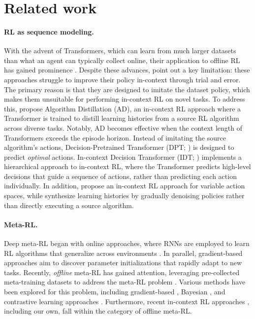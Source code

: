 \section{Related work}
\label{sec:rel}
\paragraph*{RL as sequence modeling.}
With the advent of Transformers, which can learn from much larger datasets than what an agent can typically collect online, their application to offline RL \citep{offlineRL} has gained prominence \citep{DT, TTO, MGDT, GATO}.
Despite these advances, \citet{AD} point out a key limitation: these approaches struggle to improve their policy in-context through trial and error.
The primary reason is that they are designed to imitate the dataset policy, which makes them unsuitable for performing in-context RL on novel tasks.
To address this, \citet{AD} propose Algorithm Distillation (AD), an in-context RL approach where a Transformer is trained to distill learning histories from a source RL algorithm across diverse tasks.
Notably, AD becomes effective when the context length of Transformers exceeds the episode horizon.
Instead of imitating the source algorithm's actions, Decision-Pretrained Transformer (DPT; \citet{DPT}) is designed to predict \emph{optimal} actions.
In-context Decision Transformer (IDT; \citet{IDT}) implements a hierarchical approach to in-context RL, where the Transformer predicts high-level decisions that guide a sequence of actions, rather than predicting each action individually.
In addition, \citet{Headless-AD} propose an in-context RL approach for variable action spaces, while \citet{AD-eps} synthesize learning histories by gradually denoising policies rather than directly executing a source algorithm.

\paragraph*{Meta-RL.}
Deep meta-RL began with online approaches, where RNNs are employed to learn RL algorithms that generalize across environments \citep{RL2, LtoRL}.
In parallel, gradient-based approaches \citep{MAML, Reptile} aim to discover parameter initializations that rapidly adapt to new tasks.
Recently, \emph{offline} meta-RL has gained attention, leveraging pre-collected meta-training datasets to address the meta-RL problem \citep{MACAW,BOReL,CORRO,IDAQ,MoSS}.
Various methods have been explored for this problem, including gradient-based \citep{MACAW}, Bayesian \citep{BOReL}, and contrastive learning approaches \citep{CORRO}.
Furthermore, recent in-context RL approaches \citep{AD, DPT, IDT, Headless-AD}, including our own, fall within the category of offline meta-RL.

